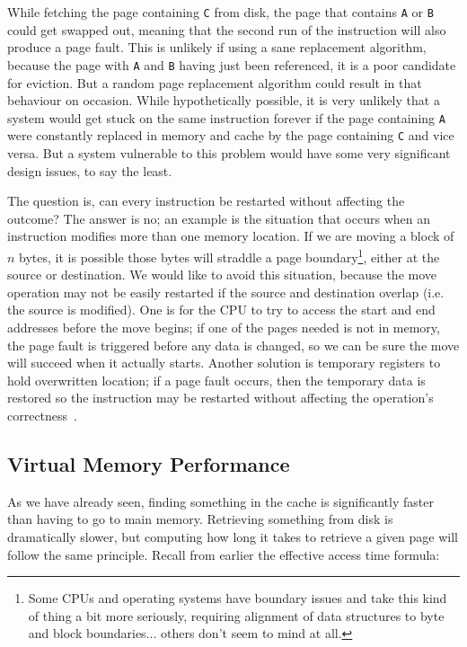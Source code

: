 While fetching the page containing \texttt{C} from disk, the page that contains \texttt{A} or \texttt{B} could get swapped out, meaning that the second run of the instruction will also produce a page fault. This is unlikely if using a sane replacement algorithm, because the page with \texttt{A} and \texttt{B} having just been referenced, it is a poor candidate for eviction. But a random page replacement algorithm could result in that behaviour on occasion. While hypothetically possible, it is very unlikely that a system would get stuck on the same instruction forever if the page containing \texttt{A} were constantly replaced in memory and cache by the page containing \texttt{C} and vice versa. But a system vulnerable to this problem would have some very significant design issues, to say the least.

The question is, can every instruction be restarted without affecting the outcome? The answer is no; an example is the situation that occurs when an instruction modifies more than one memory location. If we are moving a block of $n$ bytes, it is possible those bytes will straddle a page boundary\footnote{Some CPUs and operating systems have boundary issues and take this kind of thing a bit more seriously, requiring alignment of data structures to byte and block boundaries... others don't seem to mind at all.}, either at the source or destination. We would like to avoid this situation, because the move operation may not be easily restarted if the source and destination overlap (i.e. the source is modified). One is for the CPU to try to access the start and end addresses before the move begins; if one of the pages needed is not in memory, the page fault is triggered before any data is changed, so we can be sure the move will succeed when it actually starts. Another solution is temporary registers to hold overwritten location; if a page fault occurs, then the temporary data is restored so the instruction may be restarted without affecting the operation's correctness~\cite{osc}.

\subsection*{Virtual Memory Performance}

As we have already seen, finding something in the cache is significantly faster than having to go to main memory. Retrieving something from disk is dramatically slower, but computing how long it takes to retrieve a given page will follow the same principle. Recall from earlier the effective access time formula:

